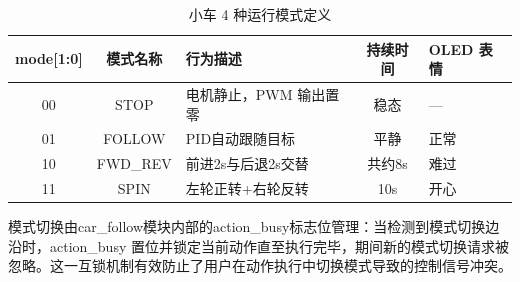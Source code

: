 \documentclass[12pt,a4paper]{ctexart}
\begin{document}
\begin{table}[H]
\centering
\caption{小车 4 种运行模式定义}
\label{tab:modes}
\begin{tabular}{cclcl}
\toprule
\textbf{mode[1:0]} & \textbf{模式名称} & \textbf{行为描述} & \textbf{持续时间} & \textbf{OLED 表情} \\
\midrule
00 & STOP      & 电机静止，PWM 输出置零          & 稳态 & --- \\
01 & FOLLOW    & PID自动跟随目标                & 平静             & 正常 \\
10 & FWD\_REV  & 前进2s与后退2s交替 & 共约8s & 难过 \\
11 & SPIN      & 左轮正转+右轮反转& 10s   & 开心 \\
\bottomrule
\end{tabular}
\end{table}

模式切换由car\_follow模块内部的action\_busy标志位管理：当检测到模式切换边沿时，action\_busy 置位并锁定当前动作直至执行完毕，期间新的模式切换请求被忽略。这一互锁机制有效防止了用户在动作执行中切换模式导致的控制信号冲突。
\end{document}
